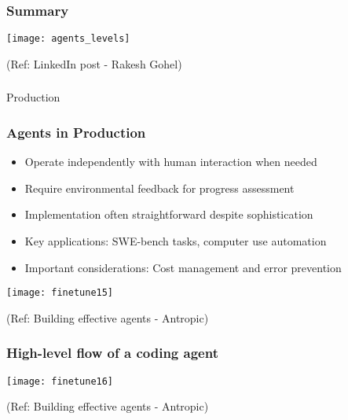 \begin{frame}[fragile]\frametitle{Summary}

\begin{center}
\texttt{[image: agents\_levels]}
\end{center}	  

{\tiny (Ref: LinkedIn post - Rakesh Gohel)}

\end{frame}

\begin{frame}[fragile]\frametitle{}
\begin{center}
{\Large Production}
\end{center}
\end{frame}

\begin{frame}[fragile]\frametitle{Agents in Production}
    \begin{itemize}
        \item Operate independently with human interaction when needed
        \item Require environmental feedback for progress assessment
        \item Implementation often straightforward despite sophistication
        \item Key applications: SWE-bench tasks, computer use automation
        \item Important considerations: Cost management and error prevention
    \end{itemize}
	
	\begin{center}
	\texttt{[image: finetune15]}
	\end{center}

	{\tiny (Ref: Building effective agents - Antropic)}		
\end{frame}

\begin{frame}[fragile]\frametitle{High-level flow of a coding agent}

	\begin{center}
	\texttt{[image: finetune16]}
	\end{center}

	{\tiny (Ref: Building effective agents - Antropic)}		
\end{frame}



